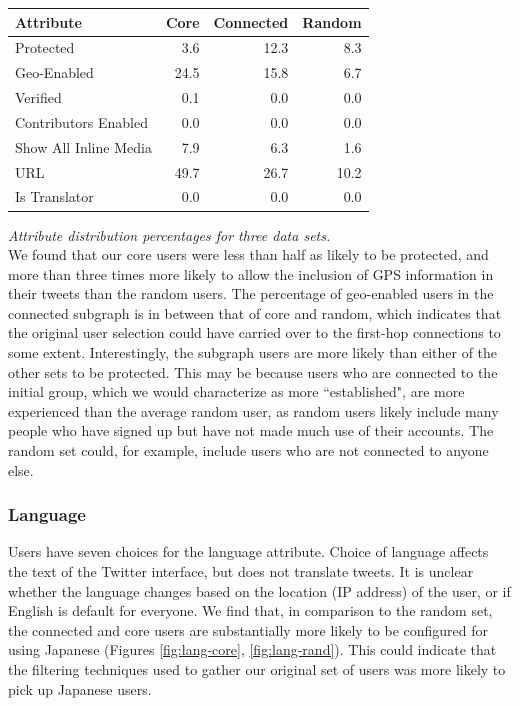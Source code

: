 \begin{center}
\begin{tabular}{| l | r | r | r |}
\hline
\textbf{Attribute} & \textbf{Core} & \textbf{Connected} & \textbf{Random} \\ \hline
Protected & 3.6 & 12.3 & 8.3 \\ \hline
Geo-Enabled & 24.5 & 15.8 & 6.7 \\ \hline
Verified & 0.1 & 0.0 & 0.0 \\ \hline
Contributors Enabled & 0.0 & 0.0 & 0.0 \\ \hline
Show All Inline Media & 7.9 & 6.3 & 1.6 \\ \hline
URL & 49.7 & 26.7 & 10.2 \\ \hline
Is Translator & 0.0 & 0.0 & 0.0 \\ \hline
\end{tabular}
\end{center}
\textit{Attribute distribution percentages for three data sets.}\\

We found that our core users were less than half as likely to be protected, and more than three times more likely to allow the inclusion of GPS information in their tweets than the random users.  The percentage of geo-enabled users in the connected subgraph is in between that of core and random, which indicates that the original user selection could have carried over to the first-hop connections to some extent.  Interestingly, the subgraph users are more likely than either of the other sets to be protected.  This may be because users who are connected to the initial group, which we would characterize as more ``established", are more experienced than the average random user, as random users likely include many people who have signed up but have not made much use of their accounts.  The random set could, for example, include users who are not connected to anyone else.

\subsubsection{Language}

Users have seven choices for the language attribute.  Choice of language affects the text of the Twitter interface, but does not translate tweets.  It is unclear whether the language changes based on the location (IP address) of the user, or if English is default for everyone.  We find that, in comparison to the random set, the connected and core users are substantially more likely to be configured for using Japanese (Figures \ref{fig:lang-core}, \ref{fig:lang-rand}).  This could indicate that the filtering techniques used to gather our original set of users was more likely to pick up Japanese users.

